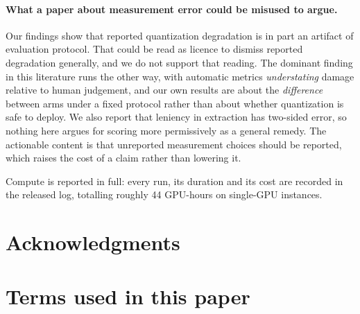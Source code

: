 \documentclass[11pt]{article}
\begin{document}
\paragraph{What a paper about measurement error could be misused to argue.}
Our findings show that reported quantization degradation is in part an artifact
of evaluation protocol. That could be read as licence to dismiss reported
degradation generally, and we do not support that reading. The dominant finding
in this literature runs the other way, with automatic metrics \emph{understating}
damage relative to human judgement, and our own results are about the
\emph{difference} between arms under a fixed protocol rather than about whether
quantization is safe to deploy. We also report that leniency in extraction has
two-sided error, so nothing here argues for scoring more permissively as a
general remedy. The actionable content is that unreported measurement choices
should be reported, which raises the cost of a claim rather than lowering it.

Compute is reported in full: every run, its duration and its cost are recorded
in the released log, totalling roughly 44 GPU-hours on single-GPU instances.

\section*{Acknowledgments}
\label{sec:ack}



\appendix

\section{Terms used in this paper}
\label{app:glossary}

%
%
\end{document}
